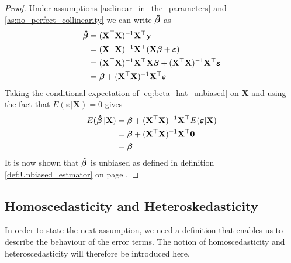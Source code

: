 \begin{proof}
    Under assumptions \ref{as:linear_in_the_parameters} and \ref{as:no_perfect_collinearity} we can write $\operatorname{\boldsymbol{\hat{\beta}}}$ as
    \begin{align}
        \operatorname{\boldsymbol{\hat{\beta}}} &= (\mathbf{X}^\top\mathbf{X})^{-1}\mathbf{X}^\top\mathbf{y} \nonumber\\
        &= (\mathbf{X}^\top\mathbf{X})^{-1}\mathbf{X}^\top(\mathbf{X}\boldsymbol{\beta} + \boldsymbol{\varepsilon}) \nonumber\\
        &=(\mathbf{X}^\top\mathbf{X})^{-1}\mathbf{X}^\top\mathbf{X}\boldsymbol{\beta} + (\mathbf{X}^\top\mathbf{X})^{-1}\mathbf{X}^\top\boldsymbol{\varepsilon} \nonumber\\
        &= \boldsymbol{\beta} + (\mathbf{X}^\top\mathbf{X})^{-1}\mathbf{X}^\top\boldsymbol{\varepsilon} \label{eq:beta_hat_unbiased}
    \end{align}
    Taking the conditional expectation of \eqref{eq:beta_hat_unbiased} on $\mathbf{X}$ and using the fact that $E(\boldsymbol{\varepsilon} | \mathbf{X}) = 0$ gives
    \begin{align*}
        E(\operatorname{\boldsymbol{\hat{\beta}}} | \mathbf{X}) &= \boldsymbol{\beta} + (\mathbf{X}^\top\mathbf{X})^{-1}\mathbf{X}^\top E(\boldsymbol{\varepsilon} | \mathbf{X}) \\
        &= \boldsymbol{\beta} + (\mathbf{X}^\top\mathbf{X})^{-1}\mathbf{X}^\top \mathbf{0} \\
        &= \boldsymbol{\beta}
    \end{align*}
    It is now shown that $\operatorname{\boldsymbol{\hat{\beta}}}$ is unbiased as defined in definition \ref{def:Unbiased_estmator} on page \pageref{def:Unbiased_estmator}.
\end{proof}

\subsection{Homoscedasticity and Heteroskedasticity}

In order to state the next assumption, we need a definition that enables us to describe the behaviour of the error terms.
The notion of homoscedasticity and heteroscedasticity will therefore be introduced here.


